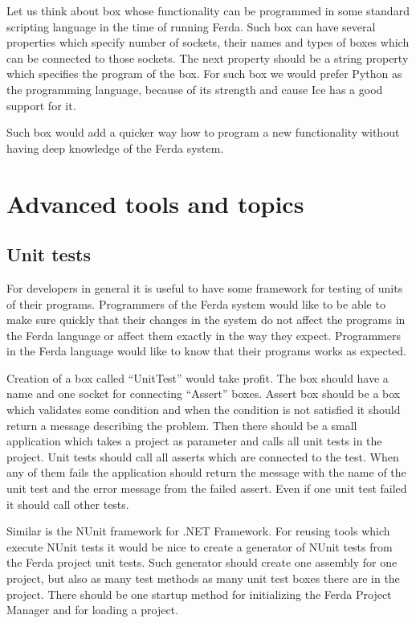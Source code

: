 \documentclass[a4paper,12pt]{book}
\begin{document}
Let us think about box whose functionality can be programmed in some standard scripting language in the time of running Ferda. Such box can have several properties which specify number of sockets, their names and types of boxes which can be connected to those sockets. The next property should be a string property which specifies the program of the box. For such box we would prefer Python as the programming language, because of its strength and cause Ice has a good support for it.

Such box would add a quicker way how to program a new functionality without having deep knowledge of the Ferda system. 

\section{Advanced tools and topics}
\label{sec:advancedToopics}
\subsection{Unit tests}
For developers in general it is useful to have some framework for testing of units of their programs. Programmers of the Ferda system would like to be able to make sure quickly that their changes in the system do not affect the programs in the Ferda language or affect them exactly in the way they expect. Programmers in the Ferda language would like to know that their programs works as expected.

Creation of a box called ``UnitTest'' would take profit. The box should have a name and one socket for connecting ``Assert'' boxes. Assert box should be a box which validates some condition and when the condition is not satisfied it should return a message describing the problem. Then there should be a small application which takes a project as parameter and calls all unit tests in the project. Unit tests should call all asserts which are connected to the test. When any of them fails the application should return the message with the name of the unit test and the error message from the failed assert. Even if one unit test failed it should call other tests.

Similar is the NUnit framework for .NET Framework. For reusing tools which execute NUnit tests it would be nice to create a generator of NUnit tests from the Ferda project unit tests. Such generator should create one assembly for one project, but also as many test methods as many unit test boxes there are in the project. There should be one startup method for initializing the Ferda Project Manager and for loading a project. 
\end{document}
